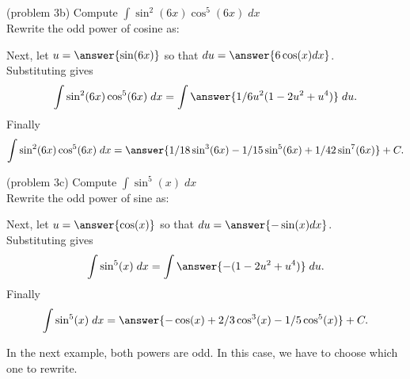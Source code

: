 \documentclass{ximera}
\begin{document}
\begin{problem}{\color{gray}(problem 3b)} Compute $\displaystyle{\int \sin^2(6x)\cos^5(6x) \; dx}$\\

Rewrite the odd power of cosine as:

\begin{multipleChoice}
\end{multipleChoice}

Next, let $u = \answer{\sin(6x)}$ so that $du = \answer{6 \cos(x) dx}$.\\
Substituting gives
\[
\int \sin^2(6x)\cos^5(6x) \; dx= \int \answer{1/6 u^2(1-2u^2 + u^4)} \; du.
\]
Finally
\[
\int \sin^2(6x)\cos^5(6x) \; dx= \answer{1/18 \sin^3(6x) - 1/15 \sin^5(6x) + 1/42 \sin^7(6x)} + C.
\]
\end{problem}


\begin{problem}{\color{gray}(problem 3c)} Compute $\displaystyle{\int \sin^5(x) \; dx}$\\
Rewrite the odd power of sine as:
\begin{multipleChoice}

\end{multipleChoice}

Next, let $u = \answer{\cos(x)}$ so that $du = \answer{-\sin(x) dx}$.\\
Substituting gives
\[
\int \sin^5(x) \; dx= \int \answer{-(1-2u^2 + u^4)} \; du.
\]
Finally
\[
\int \sin^5(x) \; dx= \answer{- \cos(x) + 2/3 \cos^3(x) - 1/5 \cos^5(x)} + C.
\]
\end{problem}

In the next example, both powers are odd.  In this case, we have to choose which one to rewrite.
\end{document}
